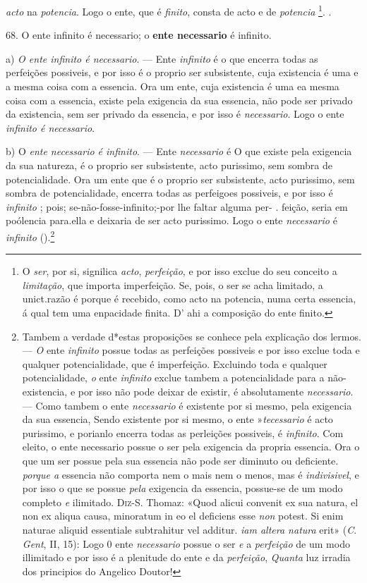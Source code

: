  \emph{acto} na \emph{potencia}. Logo o ente, que é \emph{finito}, consta de acto e de \emph{potencia} \footnote{O \emph{ser}, por si, signilica \emph{acto}, \emph{perfeição}, e por isso exclue do seu conceito a \emph{limitação}, que importa imperfeição. Se, pois, o ser se acha limitado, a unict.razão é porque é recebido, como acto na potencia, numa certa essencia, á qual tem uma enpacidade finita. D' ahi a composição do ente finito.}. .

68. O ente infinito é necessario; o \textbf{ente necessario} é infinito.

a) \emph{O ente infinito é necessario}. --- Ente \emph{infinito} é o que encerra todas as perfeições possiveis, e por isso é o proprio ser subsistente, cuja existencia é uma e a mesma coisa com a essencia. Ora um ente, cuja existencia é uma ea mesma coisa com a essencia, existe pela exigencia da sua essencia, não pode ser privado da existencia, sem ser privado da essencia, e por isso é \emph{necessario}. Logo o ente \emph{infinito é necessario}.

b) O \emph{ente necessario é infinito}. --- Ente \emph{necessario} é O que existe pela exigencia da sua natureza, é o proprio ser subsistente, acto purissimo, sem sombra de potencialidade. Ora um ente que é o proprio ser subsistente, acto purissimo, sem sombra de potencialidade, encerra todas as perfeigoes possiveis, e por isso é \emph{infinito} ; pois; se-não-fosse-infinito;-por lhe faltar alguma per- . feição, seria em poólencia para.ella e deixaria de ser acto purissimo. Logo o ente \emph{necessario} é \emph{infinito} ().\footnote{Tambem a verdade d*estas proposições se conhece pela explicação dos lermos. --- \emph{O} ente \emph{infinito} possue todas as perfeições possiveis e por isso exclue toda e qualquer potencialidade, que é imperfeição. Excluindo toda e qualquer potencialidade, \emph{o} ente \emph{infinito} exclue tambem a potencialidade para a não-existencia, e por isso não pode deixar de existir, é absolutamente \emph{necessario}. --- Como tambem o ente \emph{necessario} é existente por si mesmo, pela exigencia da sua essencia, Sendo existente por si mesmo, o ente »\emph{tecessario} é acto purissimo, e porianlo encerra todas as perleições possiveis, é \emph{infinito}. Com eleito, o ente necessario possue o ser pela exigencia da propria essencia. Ora o que um ser possue pela sua essencia não pode ser diminuto ou deficiente. \emph{porque a} essencia não comporta nem o mais nem o menos, mas é \emph{indivisivel}, e por isso o que se possue \emph{pela} exigencia da essencia, possue-se de um modo completo \emph{e} ilimitado. \textsc{Diz-S}. Thomaz: «Quod alicui convenit ex sua natura, el non ex aliqua causa, minoratum in eo el deficiens esse \emph{non} potest. Si enim naturae aliquid essentiale subtrahitur vel additur. \emph{iam altera natura} erit» (\emph{C}. \emph{Gent}, II, 15): Logo 0 ente \emph{necessario} possue o ser \emph{e} a \emph{perfeição} de um modo illimitado e por isso é a plenitude do ente e da \emph{perfeição}, \emph{Quanta} luz irradia dos principios do Angelico Doutor!}

